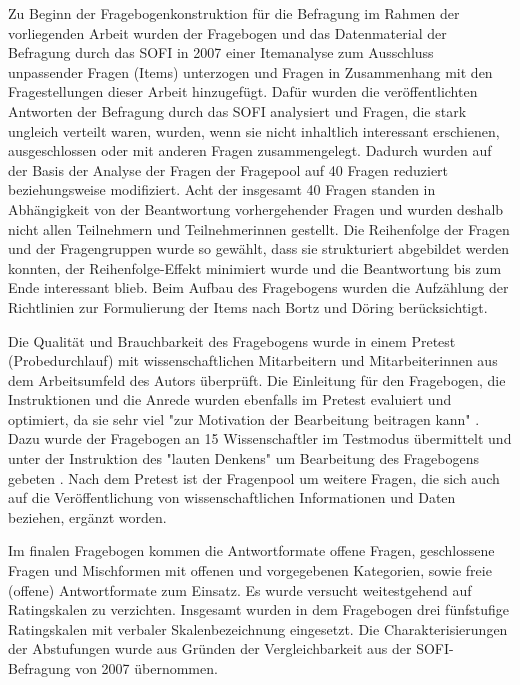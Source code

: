 Zu Beginn der Fragebogenkonstruktion für die Befragung im Rahmen der vorliegenden Arbeit wurden der Fragebogen und das Datenmaterial der Befragung durch das SOFI in 2007 einer Itemanalyse zum Ausschluss unpassender Fragen (Items) unterzogen und Fragen in Zusammenhang mit den Fragestellungen dieser Arbeit hinzugefügt. Dafür wurden die veröffentlichten Antworten der Befragung durch das SOFI analysiert \cite{Hanekop_Wittke_2007_Fragebogen} und Fragen, die stark ungleich verteilt waren, wurden, wenn sie nicht inhaltlich interessant erschienen, ausgeschlossen oder mit anderen Fragen zusammengelegt. Dadurch wurden auf der Basis der Analyse der Fragen der Fragepool auf 40 Fragen reduziert beziehungsweise modifiziert. Acht der insgesamt 40 Fragen standen in Abhängigkeit von der Beantwortung vorhergehender Fragen und wurden deshalb nicht allen Teilnehmern und Teilnehmerinnen gestellt. Die Reihenfolge der Fragen und der Fragengruppen wurde so gewählt, dass sie strukturiert abgebildet werden konnten, der Reihenfolge-Effekt minimiert wurde und die Beantwortung bis zum Ende interessant blieb. Beim Aufbau des Fragebogens wurden die Aufzählung der Richtlinien zur Formulierung der Items nach Bortz und Döring \cite{raab_2012_fragebogen} berücksichtigt.

Die Qualität und Brauchbarkeit des Fragebogens wurde in einem Pretest (Probedurchlauf) mit wissenschaftlichen Mitarbeitern und Mitarbeiterinnen aus dem Arbeitsumfeld des Autors überprüft. Die Einleitung für den Fragebogen, die Instruktionen und die Anrede wurden ebenfalls im Pretest evaluiert und optimiert, da sie sehr viel "zur Motivation der Bearbeitung beitragen kann" \cite{raab_2012_fragebogen}. Dazu wurde der Fragebogen an 15 Wissenschaftler im Testmodus übermittelt und unter der Instruktion des "lauten Denkens" um Bearbeitung des Fragebogens gebeten \cite{raab_2012_fragebogen}. Nach dem Pretest ist der Fragenpool um weitere Fragen, die sich auch auf die Veröffentlichung von wissenschaftlichen Informationen und Daten beziehen, ergänzt worden.

Im finalen Fragebogen kommen die Antwortformate offene Fragen, geschlossene Fragen und Mischformen mit offenen und vorgegebenen Kategorien, sowie freie (offene) Antwortformate zum Einsatz. Es wurde versucht weitestgehend auf Ratingskalen zu verzichten. Insgesamt wurden in dem Fragebogen drei fünfstufige Ratingskalen mit verbaler Skalenbezeichnung eingesetzt. Die Charakterisierungen der Abstufungen wurde aus Gründen der Vergleichbarkeit aus der SOFI-Befragung von 2007 übernommen.

